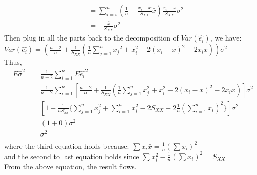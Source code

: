 \documentclass[12pt]{article}
\begin{document}
{\begin{align*}
                                 &=\displaystyle\sum_{i=i}^{n}(\frac{1}{n}-\frac{x_i-\bar{x}}{S_{XX}}\bar{x})\frac{x_i-\bar{x}}{S_{XX}}\sigma^2\\
                                 &=-\frac{\bar{x}}{S_{XX}}\sigma^2
\end{align*}
Then plug in all the parts back to the decomposition of
$Var(\hat{e_i})$, we have:\\
$Var(\hat{e_i})=(\frac{n-2}{n}+\frac{1}{S_{XX}}(\frac{1}{n}\displaystyle\sum_{j=1}^{n}{x_j}^2+x_i^2-2(x_i-\bar{x})^2-2x_i\bar{x}))\sigma^2$\\
\noindent Thus,\\
\begin{align*}
 E\hat{\sigma}^2&=\frac{1}{n-2}\displaystyle\sum_{i=1}^{n}E\hat{e_i}^2\\
                &=\frac{1}{n-2}\displaystyle\sum_{i=1}^{n}[\frac{n-2}{n}+\frac{1}{S_{XX}}(\frac{1}{n}\displaystyle\sum_{j=1}^{n}x_j^2+x_i^2-2(x_i-\bar{x})^2-2x_i\bar{x})]\sigma^2\\
                &=[1+\frac{1}{nS_{xx}}\{\displaystyle\sum_{j=1}^{n}x_j^2+\displaystyle\sum_{i=1}^{n}x_i^2-2S_{XX}-2\frac{1}{n}(\displaystyle\sum_{i=1}^{n}x_i)^2\}]\sigma^2\\
                &=(1+0)\sigma^2\\
                &=\sigma^2\\
\end{align*}
where the third equation holds because:
$\sum x_i\bar{x}=\frac{1}{n}(\sum{}{} x_i)^2$\\
and the second to last equation holds since
$\sum x_i^2-\frac{1}{n}(\sum{}{} x_i)^2=S_{XX}$\\
From the above equation, the result flows. \\
}
\end{document}
